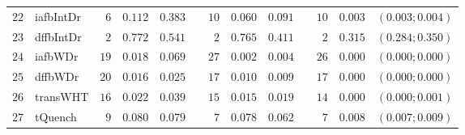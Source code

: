 \begin{table*}[!htbp]
\begin{tabular}{@{}rlrrrrrrrrrcc@{}}
\footnotesize{$22$} & \footnotesize{iafbIntDr} & \footnotesize{$6 $} & \footnotesize{$0.112$} & \footnotesize{$0.383$} && \footnotesize{$10$} & \footnotesize{$0.060$} & \footnotesize{$0.091$} && \footnotesize{$10$} & \footnotesize{$0.003$} & \footnotesize{$(0.003;0.004)$} \\
\footnotesize{$23$} & \footnotesize{dffbIntDr} & \footnotesize{$2 $} & \footnotesize{$0.772$} & \footnotesize{$0.541$} && \footnotesize{$2 $} & \footnotesize{$0.765$} & \footnotesize{$0.411$} && \footnotesize{$2 $} & \footnotesize{$0.315$} & \footnotesize{$(0.284;0.350)$} \\
\footnotesize{$24$} & \footnotesize{iafbWDr  } & \footnotesize{$19$} & \footnotesize{$0.018$} & \footnotesize{$0.069$} && \footnotesize{$27$} & \footnotesize{$0.002$} & \footnotesize{$0.004$} && \footnotesize{$26$} & \footnotesize{$0.000$} & \footnotesize{$(0.000;0.000)$} \\
\footnotesize{$25$} & \footnotesize{dffbWDr  } & \footnotesize{$20$} & \footnotesize{$0.016$} & \footnotesize{$0.025$} && \footnotesize{$17$} & \footnotesize{$0.010$} & \footnotesize{$0.009$} && \footnotesize{$17$} & \footnotesize{$0.000$} & \footnotesize{$(0.000;0.000)$} \\
\footnotesize{$26$} & \footnotesize{transWHT } & \footnotesize{$16$} & \footnotesize{$0.022$} & \footnotesize{$0.039$} && \footnotesize{$15$} & \footnotesize{$0.015$} & \footnotesize{$0.019$} && \footnotesize{$14$} & \footnotesize{$0.000$} & \footnotesize{$(0.000;0.001)$} \\
\footnotesize{$27$} & \footnotesize{tQuench  } & \footnotesize{$9 $} & \footnotesize{$0.080$} & \footnotesize{$0.079$} && \footnotesize{$7 $} & \footnotesize{$0.078$} & \footnotesize{$0.062$} && \footnotesize{$7 $} & \footnotesize{$0.008$} & \footnotesize{$(0.007;0.009)$} \\
\bottomrule
\end{tabular}
\end{table*}


